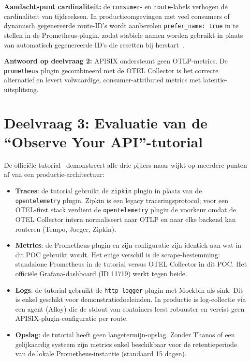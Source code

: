 \textbf{Aandachtspunt cardinaliteit:} de \texttt{consumer}- en \texttt{route}-labels verhogen de cardinaliteit van tijdreeksen. In productieomgevingen met veel consumers of dynamisch gegenereerde route-ID's wordt aanbevolen \texttt{prefer\_name: true} in te stellen in de Prometheus-plugin, zodat stabiele namen worden gebruikt in plaats van automatisch gegenereerde ID's die resetten bij herstart~\autocite{APISIX2024}.

\textbf{Antwoord op deelvraag 2:} APISIX ondersteunt geen OTLP-metrics. De \texttt{prometheus} plugin gecombineerd met de OTEL Collector is het correcte alternatief en levert volwaardige, consumer-attributed metrics met latentie-uitsplitsing.

\section{Deelvraag 3: Evaluatie van de ``Observe Your API''-tutorial}%
\label{sec:bevinding-tutorial}

De officiële tutorial~\autocite{APISIXObserveTutorial2024} demonstreert alle drie pijlers maar wijkt op meerdere punten af van een productie-architectuur:

\begin{itemize}
  \item \textbf{Traces}: de tutorial gebruikt de \texttt{zipkin} plugin in plaats van de \texttt{opentelemetry} plugin. Zipkin is een legacy traceringsprotocol; voor een OTEL-first stack verdient de \texttt{opentelemetry} plugin de voorkeur omdat de OTEL Collector intern normaliseert naar OTLP en naar elke backend kan routeren (Tempo, Jaeger, Zipkin).
  \item \textbf{Metrics}: de Prometheus-plugin en zijn configuratie zijn identiek aan wat in dit POC gebruikt wordt. Het enige verschil is de scrape-bestemming: standalone Prometheus in de tutorial versus OTEL Collector in dit POC. Het officiële Grafana-dashboard (ID 11719) werkt tegen beide.
  \item \textbf{Logs}: de tutorial gebruikt de \texttt{http-logger} plugin met Mockbin als sink. Dit is enkel geschikt voor demonstratiedoeleinden. In productie is log-collectie via een agent (Alloy) die de stdout van containers leest robuuster en vereist geen APISIX-plugin-configuratie per route.
  \item \textbf{Opslag}: de tutorial heeft geen langetermijn-opslag. Zonder Thanos of een gelijkaardig systeem zijn metrics enkel beschikbaar voor de retentieperiode van de lokale Prometheus-instantie (standaard 15 dagen).
\end{itemize}

